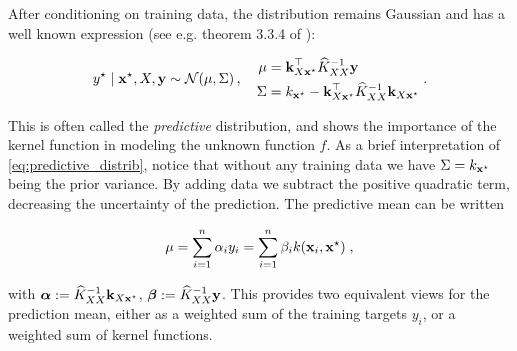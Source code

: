 \documentclass{article}
\begin{document}
After conditioning on training data, the distribution remains Gaussian and has a well known expression (see e.g. theorem 3.3.4 of \cite{tong_multivariate_1990}):

\begin{equation} \label{eq:predictive_distrib}
    y^\star \mid \boldsymbol{\mathbf{x}}^\star, X, \boldsymbol{\mathbf{y}} \sim \mathcal N(\mu, \Sigma) \, , \quad 
    \begin{aligned}
        \mu &= \boldsymbol{\mathbf{k}}_{X \boldsymbol{\mathbf{x}}^\star}^\top \widehat K_{XX}^{-1} \boldsymbol{\mathbf{y}} \\
        \Sigma &= k_{\boldsymbol{\mathbf{x}}^\star} - \boldsymbol{\mathbf{k}}_{X \boldsymbol{\mathbf{x}}^\star}^\top \widehat K_{XX}^{-1} \boldsymbol{\mathbf{k}}_{X \boldsymbol{\mathbf{x}}^\star}
    \end{aligned} \; .
\end{equation}

This is often called the \emph{predictive} distribution, and shows the importance of the kernel function in modeling the unknown function $f$. 
As a brief interpretation of \eqref{eq:predictive_distrib}, notice that without any training data we have $\Sigma = k_{\boldsymbol{\mathbf{x}}^\star}$ being the prior variance. By adding data we subtract the positive quadratic term, decreasing the uncertainty of the prediction. %
The predictive mean can be written

\begin{equation*}
    \mu = \sum_{i=1}^n \alpha_i y_i = \sum_{i=1}^n \beta_i k(\boldsymbol{\mathbf{x}}_i, \boldsymbol{\mathbf{x}}^\star) \;,
\end{equation*}

with $\boldsymbol{\mathbf{\alpha}} := \widehat K_{XX}^{-1} \boldsymbol{\mathbf{k}}_{X\boldsymbol{\mathbf{x}}^\star}$, $\boldsymbol{\mathbf{\beta}} := \widehat K_{XX}^{-1} \boldsymbol{\mathbf{y}}$. This provides two equivalent views for the prediction mean, either as a weighted sum of the training targets $y_i$, or a weighted sum of kernel functions.
\end{document}
